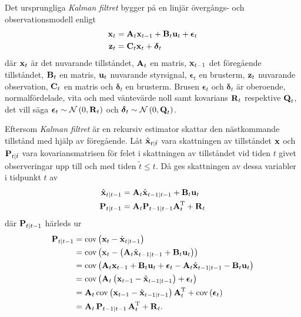 \documentclass[11pt]{article}
\newcommand{\bfr}[1]{\textbf{\textrm{{#1}}}}
\begin{document}
\begin{flushleft}
Det ursprungliga \emph{Kalman filtret} bygger på en linjär övergångs- och observationsmodell enligt
\begin{align*}
	\bfr{x}_t &= \bfr{A}_{t}\bfr{x}_{t-1} + \bfr{B}_{t}\bfr{u}_t + \boldsymbol{\epsilon}_t \\
	\bfr{z}_t &= \bfr{C}_{t}\bfr{x}_t + \boldsymbol{\delta}_t
\end{align*}
där $\bfr{x}_t$ är det nuvarande tillståndet, $\bfr{A}_t$ en matris, $\bfr{x}_{t-1}$ det föregående tillståndet, $\bfr{B}_t$ en matris, $\bfr{u}_t$ nuvarande styrsignal, $\boldsymbol{\epsilon}_t$ en brusterm, $\bfr{z}_t$ nuvarande observation, $\bfr{C}_t$ en matris och $\boldsymbol{\delta}_t$ en brusterm. Brusen $\boldsymbol{\epsilon}_t$ och $\boldsymbol{\delta}_t$ är oberoende, normalfördelade, vita och  med väntevärde noll samt kovarians $\bfr{R}_t$ respektive $\bfr{Q}_t$, det vill säga $\boldsymbol{\epsilon}_t \sim \mathcal{N}\left(0,\bfr{R}_t\right)$ och $\boldsymbol{\delta}_t \sim \mathcal{N}\left(0,\bfr{Q}_t\right)$.

Eftersom \emph{Kalman filtret} är en rekursiv estimator skattar den nästkommande tillstånd med hjälp av föregående. Låt $\hat{\bfr{x}}_{t\vert \tilde{t}}$ vara skattningen av tillståndet $\bfr{x}$ och $\bfr{P}_{t\vert \tilde{t}}$ vara kovariansmatrisen för felet i skattningen av tillståndet vid tiden $t$ givet observeringar upp till och med tiden $\tilde{t}\leq t$. Då ges skattningen av dessa variabler i tidpunkt $t$ av
\begin{align*}
	\hat{\bfr{x}}_{t\vert t-1} &= \bfr{A}_{t}\hat{\bfr{x}}_{t-1\vert t-1} + \bfr{B}_{t}\bfr{u}_{t} \\
	\bfr{P}_{t\vert t-1} & = \bfr{A}_{t}\bfr{P}_{t-1\vert t-1}\bfr{A}_{t}^{\mathrm{T}} + \bfr{R}_t
\end{align*}
där $\bfr{P}_{t\vert t-1}$ härleds ur
\begin{align*}
	\bfr{P}_{t\vert t-1} &= \mathrm{cov}\left(\bfr{x}_{t}-\hat{\bfr{x}}_{t\vert t-1}\right) \\
	&= \mathrm{cov}\left(\bfr{x}_{t}-\left(\bfr{A}_{t}\hat{\bfr{x}}_{t-1\vert t-1} + \bfr{B}_{t}\bfr{u}_{t}\right)\right) \\
	&= \mathrm{cov}\left(\bfr{A}_{t}\bfr{x}_{t-1} + \bfr{B}_{t}\bfr{u}_t + \boldsymbol{\epsilon}_{t} - \bfr{A}_{t}\hat{\bfr{x}}_{t-1\vert t-1} - \bfr{B}_{t}\bfr{u}_t\right) \\
	&= \mathrm{cov}\left(\bfr{A}_{t}\left(\bfr{x}_{t-1} - \hat{\bfr{x}}_{t-1\vert t-1}\right) + \boldsymbol{\epsilon}_{t}\right) \\
	&= \bfr{A}_{t}\,\mathrm{cov}\left(\bfr{x}_{t-1} - \hat{\bfr{x}}_{t-1\vert t-1}\right)\bfr{A}_{t}^{\mathrm{T}} + \mathrm{cov}\left(\boldsymbol{\epsilon}_{t}\right) \\
	&= \bfr{A}_{t}\,\bfr{P}_{t-1\vert t-1}\,\bfr{A}_{t}^{\mathrm{T}} + \bfr{R}_{t}.
\end{align*}


\end{flushleft}
\end{document}
